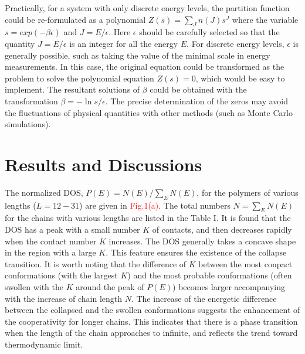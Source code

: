 \documentclass[preprint,preprintnumbers,amsmath,amssymb,showpacs,aps,pre]{revtex4-1}
\begin{document}
Practically, for a system with only discrete energy levels, the partition
function could be
re-formulated as a polynomial $Z(s)=\sum_J n(J) s^J$ where the variable
$s=exp(-\beta\epsilon)$ and $J=E/\epsilon$. Here $\epsilon$ should be carefully
selected so that the quantity $J=E/\epsilon$ is an integer for all the energy
$E$. For discrete energy levels, $\epsilon$ is generally possible, such as
taking the value of the minimal scale in energy measurements. In this case, the
original equation could be transformed as the problem to solve the polynomial
equation $Z(s)=0$, which would be easy to implement. The resultant solutions
of $\beta$ could be obtained with the transformation $\beta=-\ln s/\epsilon$.
The precise determination of the zeros may avoid the fluctuations of physical
quantities with other methods (such as Monte Carlo simulations).

\section{Results and Discussions}

The normalized DOS, $P(E)=N(E)/\sum_E N(E)$, for the polymers of various
lengths ($L=12-31$) are given in \textcolor{red}{Fig.1(a)}. The total
numbers $N=\sum_E N(E)$ for the chains with various lengths are listed
in the Table I. It is found that the DOS has a peak with a small number $K$ of
contacts, and then decreases rapidly when the contact number $K$ increases.
The DOS generally takes a concave shape in the region with a large $K$. This
feature ensures the existence of the collapse transition. It is worth noting
that the difference of $K$ between the most conpact conformations (with the
largest $K$) and the most probable conformations (often swollen with the $K$
around the peak of $P(E)$) becomes larger accompanying with the increase of
chain length $N$. The increase of the energetic difference between the
collapsed and the swollen conformations suggests the enhancement of the
cooperativity for longer chains. This indicates that there is a phase
transition when the length of the chain approaches to infinite, and reflects
the trend toward thermodynamic limit.
\end{document}
